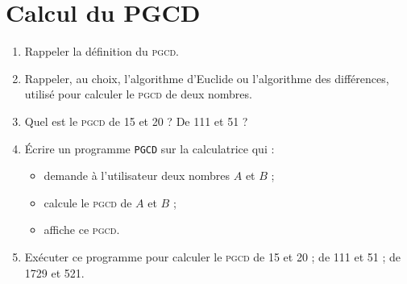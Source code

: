 \documentclass[12pt]{article}
\begin{document}
\section*{Calcul du PGCD}

\begin{enumerate}
  \item Rappeler la définition du \textsc{pgcd}.
  \item Rappeler, au choix, l'algorithme d'Euclide ou l'algorithme des
    différences, utilisé pour calculer le \textsc{pgcd} de deux nombres.
  \item Quel est le \textsc{pgcd} de 15 et 20 ? De 111 et 51 ?
  \item Écrire un programme \texttt{PGCD} sur la calculatrice qui :
    \begin{itemize}
      \item demande à l'utilisateur deux nombres $A$ et $B$ ;
      \item calcule le \textsc{pgcd} de $A$ et $B$ ;
      \item affiche ce \textsc{pgcd}.
    \end{itemize}
  \item Exécuter ce programme pour calculer le \textsc{pgcd} de 15 et 20 ; de 111 et
    51 ; de 1729 et 521.
\end{enumerate}
\end{document}
